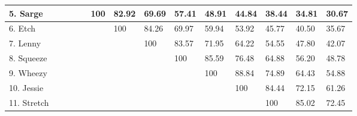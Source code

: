 \documentclass[a4paper, 12pt]{book}
\begin{document}
\begin{table}[htbp]
{\begin{tabular}{|l|l|l|l|l|l|l|l|l|l|l|l|l|l|}
				5. Sarge     & \cellcolor[HTML]{000000} & \cellcolor[HTML]{000000} & \cellcolor[HTML]{000000} & \cellcolor[HTML]{000000} & 100                      & 82.92                    & 69.69                    & 57.41                    & 48.91                    & 44.84                    & 38.44                    & 34.81                    & 30.67        \\ \hline
				6. Etch      & \cellcolor[HTML]{000000} & \cellcolor[HTML]{000000} & \cellcolor[HTML]{000000} & \cellcolor[HTML]{000000} & \cellcolor[HTML]{000000} & 100                      & 84.26                    & 69.97                    & 59.94                    & 53.92                    & 45.77                    & 40.50                    & 35.67        \\ \hline
				7. Lenny     & \cellcolor[HTML]{000000} & \cellcolor[HTML]{000000} & \cellcolor[HTML]{000000} & \cellcolor[HTML]{000000} & \cellcolor[HTML]{000000} & \cellcolor[HTML]{000000} & 100                      & 83.57                    & 71.95                    & 64.22                    & 54.55                    & 47.80                    & 42.07        \\ \hline
				8. Squeeze   & \cellcolor[HTML]{000000} & \cellcolor[HTML]{000000} & \cellcolor[HTML]{000000} & \cellcolor[HTML]{000000} & \cellcolor[HTML]{000000} & \cellcolor[HTML]{000000} & \cellcolor[HTML]{000000} & 100                      & 85.59                    & 76.48                    & 64.88                    & 56.20                    & 48.78        \\ \hline
				9. Wheezy    & \cellcolor[HTML]{000000} & \cellcolor[HTML]{000000} & \cellcolor[HTML]{000000} & \cellcolor[HTML]{000000} & \cellcolor[HTML]{000000} & \cellcolor[HTML]{000000} & \cellcolor[HTML]{000000} & \cellcolor[HTML]{000000} & 100                      & 88.84                    & 74.89                    & 64.43                    & 54.88        \\ \hline
				10. Jessie   & \cellcolor[HTML]{000000} & \cellcolor[HTML]{000000} & \cellcolor[HTML]{000000} & \cellcolor[HTML]{000000} & \cellcolor[HTML]{000000} & \cellcolor[HTML]{000000} & \cellcolor[HTML]{000000} & \cellcolor[HTML]{000000} & \cellcolor[HTML]{000000} & 100                      & 84.44                    & 72.15                    & 61.26        \\ \hline
				11. Stretch  & \cellcolor[HTML]{000000} & \cellcolor[HTML]{000000} & \cellcolor[HTML]{000000} & \cellcolor[HTML]{000000} & \cellcolor[HTML]{000000} & \cellcolor[HTML]{000000} & \cellcolor[HTML]{000000} & \cellcolor[HTML]{000000} & \cellcolor[HTML]{000000} & \cellcolor[HTML]{000000} & 100                      & 85.02                    & 72.45        \\ \hline

\end{tabular}}
\end{table}
\end{document}
